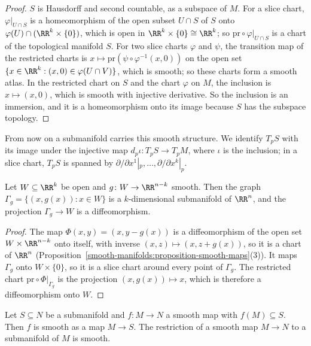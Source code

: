 \begin{proof}
$S$ is Hausdorff and second countable, as a subspace of $M$. For a slice chart, $\varphi|_{U \cap S}$ is a homeomorphism of the open subset $U \cap S$ of $S$
onto $\varphi(U) \cap (\RR^k \times \{0\})$, which is open in $\RR^k \times \{0\} \cong \RR^k$; so $\mathrm{pr} \circ \varphi|_{U \cap S}$ is a chart of the
topological manifold $S$. For two slice charts $\varphi$ and $\psi$, the transition map of the restricted charts is $x \mapsto \mathrm{pr}(\psi \circ
\varphi^{-1}(x, 0))$ on the open set $\{x \in \RR^k : (x, 0) \in \varphi(U \cap V)\}$, which is smooth; so these charts form a smooth atlas. In the restricted
chart on $S$ and the chart $\varphi$ on $M$, the inclusion is $x \mapsto (x, 0)$, which is smooth with injective derivative. So the inclusion is an immersion,
and it is a homeomorphism onto its image because $S$ has the subspace topology.
\end{proof}

From now on a submanifold carries this smooth structure. We identify $T_pS$ with its image under the injective map $d_p\iota \colon T_pS \to T_pM$, where
$\iota$ is the inclusion; in a slice chart, $T_pS$ is spanned by $\partial/\partial x^1|_p, \ldots, \partial/\partial x^k|_p$.

\begin{proposition}\label{smooth-manifolds:proposition-graph-submanifold}
Let $W \subseteq \RR^k$ be open and $g \colon W \to \RR^{n-k}$ smooth. Then the graph $\Gamma_g = \{(x, g(x)) : x \in W\}$ is a $k$-dimensional submanifold of
$\RR^n$, and the projection $\Gamma_g \to W$ is a diffeomorphism.
\end{proposition}

\begin{proof}
The map $\Phi(x, y) = (x, y - g(x))$ is a diffeomorphism of the open set $W \times \RR^{n-k}$ onto itself, with inverse $(x, z) \mapsto (x, z + g(x))$, so it is a
chart of $\RR^n$ (Proposition~\ref{smooth-manifolds:proposition-smooth-maps}(3)). It maps $\Gamma_g$ onto $W \times \{0\}$, so it is a slice chart around every
point of $\Gamma_g$. The restricted chart $\mathrm{pr} \circ \Phi|_{\Gamma_g}$ is the projection $(x, g(x)) \mapsto x$, which is therefore a diffeomorphism onto $W$.
\end{proof}

\begin{proposition}\label{smooth-manifolds:proposition-restrict-codomain}
Let $S \subseteq N$ be a submanifold and $f \colon M \to N$ a smooth map with $f(M) \subseteq S$. Then $f$ is smooth as a map $M \to S$. The restriction of a
smooth map $M \to N$ to a submanifold of $M$ is smooth.
\end{proposition}

